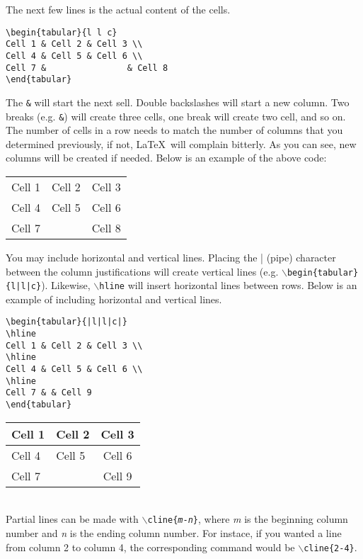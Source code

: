 \documentclass{article}
\begin{document}
The next few lines is the actual content of the cells.
\begin{verbatim}
\begin{tabular}{l l c}
Cell 1 & Cell 2 & Cell 3 \\
Cell 4 & Cell 5 & Cell 6 \\
Cell 7 &				& Cell 8
\end{tabular}
\end{verbatim}
The \texttt{\&} will start the next sell. Double backslashes will start a new column. Two breaks (e.g. \texttt{\&}) will create three cells, one break will create two cell, and so on. The number of cells in a row needs to match the number of columns that you determined previously, if not, \LaTeX\ will complain bitterly. As you can see, new columns will be created if needed. Below is an example of the above code:
\begin{tabular}{l l c}
Cell 1 & Cell 2 & Cell 3 \\
Cell 4 & Cell 5 & Cell 6 \\
Cell 7 &				& Cell 8
\end{tabular}

You may include horizontal and vertical lines. Placing the | (pipe) character between the column justifications will create vertical lines (e.g. \texttt{$\backslash$begin\{tabular\}\{l|l|c\}}). Likewise, \texttt{$\backslash$hline} will insert horizontal lines between rows. Below is an example of including horizontal and vertical lines.
\begin{verbatim}
\begin{tabular}{|l|l|c|}
\hline
Cell 1 & Cell 2 & Cell 3 \\
\hline
Cell 4 & Cell 5 & Cell 6 \\
\hline
Cell 7 & & Cell 9
\end{tabular}
\end{verbatim}
\begin{tabular}{|l|l|c|}
\hline
Cell 1 & Cell 2 & Cell 3 \\
\hline 
Cell 4 & Cell 5 & Cell 6 \\
\hline
Cell 7 & & Cell 9 \\
\hline
\end{tabular}
\\
Partial lines can be made with \texttt{$\backslash$cline\{\textit{m}-\textit{n}\}}, where \textit{m} is the beginning column number and \textit{n} is the ending column number. For instace, if you wanted a line from column 2 to column 4, the corresponding command would be \texttt{$\backslash$cline\{2-4\}}.
\end{document}
